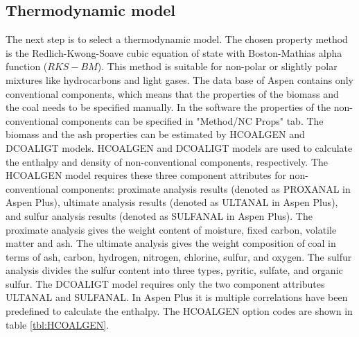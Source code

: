 \subsection{Thermodynamic model} \label{CH::GasifierThermodynamics}
The next step is to select a thermodynamic model. The chosen property method is the Redlich-Kwong-Soave cubic equation of state with Boston-Mathias alpha function ($RKS-BM$). This method is suitable for non-polar or slightly polar mixtures like hydrocarbons and light gases. The data base of Aspen contains only conventional components, which means that the properties of the biomass and the coal needs to be specified manually. In the software the properties of the non-conventional components can be specified in "Method/NC Props" tab. The biomass and the ash properties can be estimated by HCOALGEN and DCOALIGT models. HCOALGEN and DCOALIGT models are used to calculate the enthalpy and density of non-conventional components, respectively. The HCOALGEN model requires these three component attributes for non-conventional components: proximate analysis results (denoted as PROXANAL in Aspen Plus), ultimate analysis results (denoted as ULTANAL in Aspen Plus), and sulfur analysis results (denoted as SULFANAL in Aspen Plus). The proximate analysis gives the weight content of moisture, fixed carbon, volatile matter and ash. The ultimate analysis gives the weight composition of coal in terms of ash, carbon, hydrogen, nitrogen, chlorine, sulfur, and oxygen. The sulfur analysis divides the sulfur content into three types, pyritic, sulfate, and organic sulfur. The DCOALIGT model requires only the two component attributes ULTANAL and SULFANAL. In Aspen Plus it is multiple correlations have been predefined to calculate the enthalpy. The HCOALGEN option codes are shown in table \ref{tbl:HCOALGEN}. 

